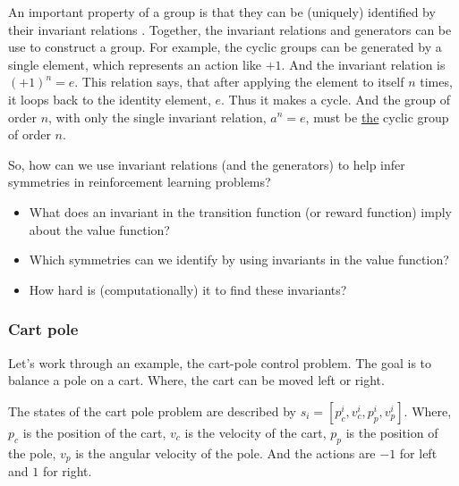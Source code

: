 An important property of a group is that they can be (uniquely) identified by their invariant relations \cite{PeterOlver1999}.
Together, the invariant relations and generators can be use to construct a group.
For example, the cyclic groups can be generated by a single element, which represents an action like $+1$.
And the invariant relation is $(+1)^n = e$. This relation says, that after applying the element to itself $n$ times,
it loops back to the identity element, $e$. Thus it makes a cycle.
And the group of order $n$, with only the single invariant relation, $a^n = e$, must be \underline{the} cyclic group of order $n$.


So, how can we use invariant relations (and the generators) to help infer symmetries in reinforcement learning problems?

\begin{itemize}
	\tightlist
  \item What does an invariant in the transition function (or reward function) imply about the value function?
	\item Which symmetries can we identify by using invariants in the value function?
  \item How hard is (computationally) it to find these invariants?
\end{itemize}

\subsubsection{Cart pole}

Let's work through an example, the cart-pole control problem. The goal is to balance a pole on a cart.
Where, the cart can be moved left or right.

The states of the cart pole problem are described by $s_i = [p_c^i, v_c^i, p_p^i, v_p^i]$\footnotemark. Where, $p_c$ is the position of the cart, $v_c$ is the velocity of the cart, $p_p$ is the position of the pole, $v_p$ is the angular velocity of the pole. And the actions are $-1$ for left and $1$ for right.


